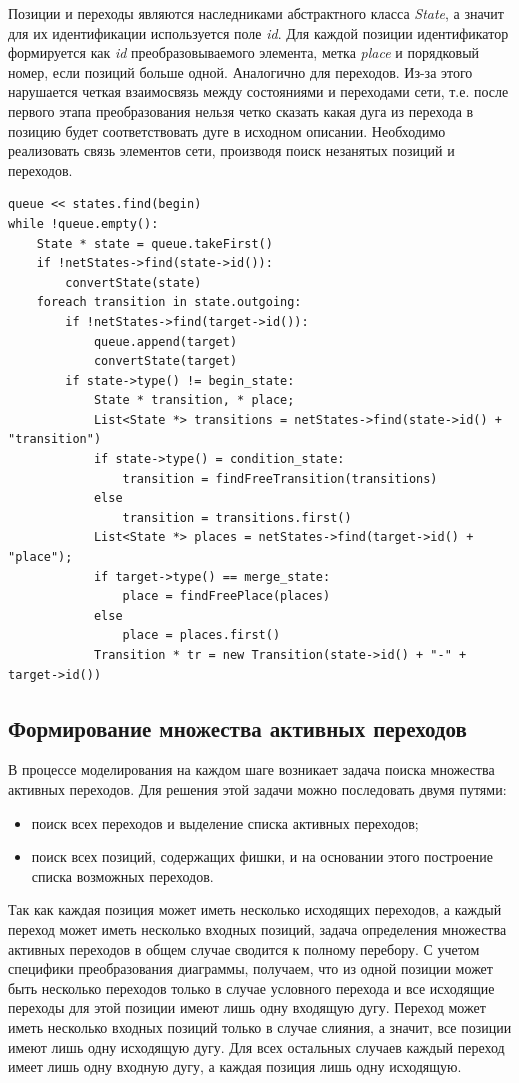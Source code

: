 Позиции и переходы являются наследниками абстрактного класса \textit{State}, а значит для их идентификации используется поле \textit{id}. Для каждой позиции идентификатор формируется как \textit{id} преобразовываемого элемента, метка \textit{place} и порядковый номер, если позиций больше одной. Аналогично для переходов. Из-за этого нарушается четкая взаимосвязь между состояниями и переходами сети, т.е. после первого этапа преобразования нельзя четко сказать какая дуга из  перехода в позицию будет соответствовать дуге в исходном описании. Необходимо реализовать связь элементов сети, производя поиск незанятых позиций и переходов.
\begin{lstlisting}[style=pseudocode,caption={Алгоритм преобразования в простую сеть Петри}]
queue << states.find(begin)
while !queue.empty():
	State * state = queue.takeFirst()
	if !netStates->find(state->id()):
		convertState(state)
	foreach transition in state.outgoing:
		if !netStates->find(target->id()):
			queue.append(target)
			convertState(target)
		if state->type() != begin_state:
			State * transition, * place;
			List<State *> transitions = netStates->find(state->id() + "transition")
			if state->type() = condition_state:
				transition = findFreeTransition(transitions)
			else
				transition = transitions.first()
			List<State *> places = netStates->find(target->id() +  "place");
			if target->type() == merge_state:
				place = findFreePlace(places)
			else
				place = places.first()
			Transition * tr = new Transition(state->id() + "-" + target->id())
\end{lstlisting}

\subsection{Формирование множества активных переходов}

В процессе моделирования на каждом шаге возникает задача поиска множества активных переходов. Для решения этой задачи можно последовать двумя путями:

\begin{itemize}
\item поиск всех переходов и выделение списка активных переходов;
\item поиск всех позиций, содержащих фишки, и на основании этого построение списка возможных переходов.
\end{itemize}

Так как каждая позиция может иметь несколько исходящих переходов, а каждый переход может иметь несколько входных позиций, задача определения множества активных переходов в общем случае сводится к полному перебору. С учетом специфики преобразования диаграммы, получаем, что из одной позиции может быть несколько переходов только в случае условного перехода и все исходящие переходы для этой позиции имеют лишь одну входящую дугу. Переход может иметь несколько входных позиций только в случае слияния, а значит, все позиции имеют лишь одну исходящую дугу. Для всех остальных случаев каждый переход имеет лишь одну входную дугу, а каждая позиция лишь одну исходящую.

